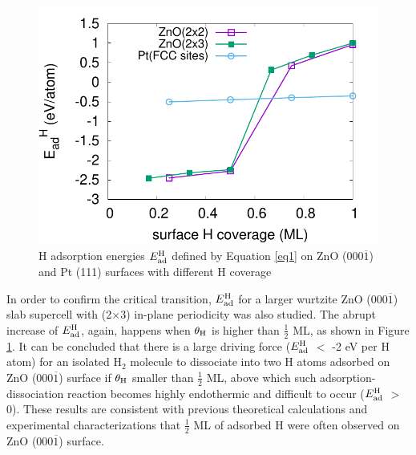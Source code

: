 \begingroup
\begin{figure}[!ht]
  \centering
  \includegraphics[width=0.9\linewidth]{Chap1/plots/Eadh_coverage_H.pdf}
\caption[H adsorption energies on ZnO surfaces with different H coverage]{H adsorption energies $E_{\textup{ad}}^{\textup{H}}$ defined by Equation \ref{eq1} on ZnO (000$\overline{1}$) and Pt (111) surfaces with different H coverage}
  \label{Chap:ZnO_H:fig:Ead}
\end{figure}
\endgroup

In order to confirm the critical transition, $E_{\textup{ad}}^{\textup{H}}$ for a larger wurtzite ZnO (000$\overline{1}$) slab supercell with (2$\times$3) in-plane periodicity was also studied. The abrupt increase of $E_{\textup{ad}}^{\textup{H}}$, again, happens when $\theta_{\textup{H}}$ is higher than $\frac{1}{2}$ ML, as shown in Figure \ref{Chap:ZnO_H:fig:Ead}. It can be concluded that there is a large driving force ($E_{\textup{ad}}^{\textup{H}}$ $<$ -2 eV per H atom) for an isolated H$_2$ molecule to dissociate into two H atoms adsorbed on ZnO (000$\overline{1}$) surface if $\theta_{\textup{H}}$ smaller than $\frac{1}{2}$ ML, above which such adsorption-dissociation reaction becomes highly endothermic and difficult to occur ($E_{\textup{ad}}^{\textup{H}}$ $>$ 0). These results are consistent with previous theoretical calculations and experimental characterizations that $\frac{1}{2}$ ML of adsorbed H were often observed on ZnO (000$\overline{1}$) surface\cite{lin2007density,meyer2004first,lauritsen2011stabilization}.
